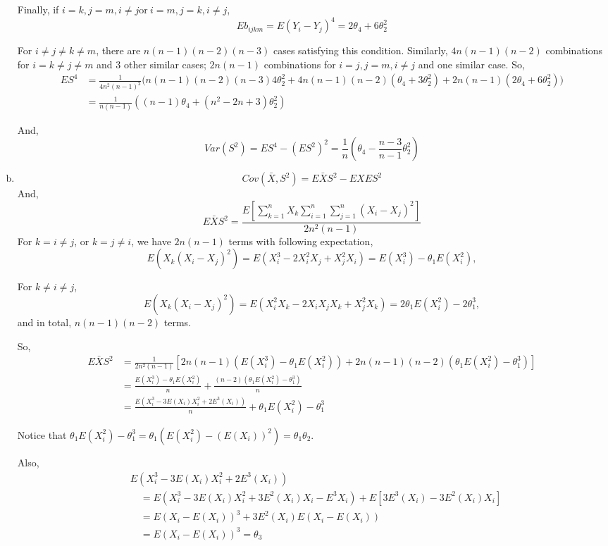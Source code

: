 \documentclass[letterpaper]{article}
\newcommand{\sumi}{\sum_{i=1}^n}
\newcommand{\sumj}{\sum_{j=1}^n}
\begin{document}
\begin{enumerate}[(a)]
    Finally, if $i = k, j = m, i \ne j \text{or}~ i = m, j = k, i \ne j$, 
    \[
    Eb_{ijkm} = E(Y_i - Y_j)^4 = 2\theta_4 + 6\theta_2^2 
    \]

    For $i \ne j \ne k \ne m$, there are $n(n-1)(n-2)(n-3)$ cases satisfying this condition. Similarly, $4n(n-1)(n-2)$ combinations for $i = k \ne j \ne m$ and 3 other similar cases; $2n(n-1)$ combinations for $i=j, j=m, i \ne j$ and one similar case.
    So,
    \begin{align*}
    ES^4 & = \frac{1}{4n^2(n-1)^2} \Big(n(n-1)(n-2)(n-3)4\theta_2^2 + 4n(n-1)(n-2) (\theta_4 + 3\theta_2^2) + 2n(n-1) (2\theta_4 + 6\theta_2^2) \Big) \\
    & = \frac{1}{n(n-1)} \left((n-1)\theta_4 + (n^2 - 2n+3) \theta_2^2 \right)
    \end{align*}
    
    And,
    \[
    Var(S^2) = ES^4 - (ES^2)^2 = \frac{1}{n} \left(\theta_4 - \frac{n-3}{n-1} \theta_2^2 \right)
    \]
    
    \item
    \[
    Cov(\bar X, S^2) = E\bar X S^2 - EX ES^2
    \]
    And, 
    \[
    E\bar X S^2 = \frac{E \left[ \sum_{k=1}^n X_k \sumi \sumj (X_i - X_j)^2 \right]}{2n^2(n-1)} 
    \]
    For $k = i \ne j$,  or $k = j \ne i$, we have $2n(n-1)$ terms with following expectation,
    \[
    E( X_k  (X_i - X_j)^2 ) = E(X_i^3 - 2X_i^2X_j + X_j^2 X_i) = E(X_i^3) - \theta_1 E(X_i^2),
    \]

    For $k \ne i \ne j$,
    \[
    E( X_k (X_i - X_j)^2) = E(X_i^2X_k - 2X_iX_jX_k + X_j^2 X_k) = 2\theta_1E(X_i^2) - 2\theta_1^3,
    \]
    and in total, $n(n-1)(n-2)$ terms.

    So, 
    \begin{align*}
    E\bar X S^2 & = \frac{1}{2n^2(n-1)} \left[2n(n-1) \left(E(X_i^3) - \theta_1 E(X_i^2)\right) + 2n(n-1)(n-2) \left(\theta_1 E(X_i^2) - \theta_1^3 \right) \right] \\
    & = \frac{E(X_i^3) - \theta_1 E(X_i^2)}{n} + \frac{(n-2)(\theta_1E(X_i^2) - \theta_1^3)}{n} \\
    & = \frac{E\left(X_i^3 - 3 E(X_i) X_i^2 + 2E^3(X_i)\right)}{n} + \theta_1 E(X_i^2) - \theta_1^3 
    \end{align*}

    Notice that $\theta_1 E(X_i^2) - \theta_1^3 = \theta_1 (E(X_i^2) - (E(X_i))^2) = \theta_1 \theta_2$.

    Also,
    \begin{align*}
    & E\left(X_i^3 - 3E(X_i) X_i^2 + 2E^3(X_i) \right) \\ 
    & \quad = E\left(X_i^3 - 3E(X_i) X_i^2 + 3E^2(X_i)X_i - E^3{X_i}\right) + E\left[3E^3(X_i) - 3E^2(X_i)X_i\right] \\
    & \quad = E(X_i - E(X_i))^3 + 3E^2(X_i) E(X_i - E(X_i)) \\
    & \quad = E(X_i - E(X_i))^3 = \theta_3
    \end{align*}


\end{enumerate}
\end{document}
